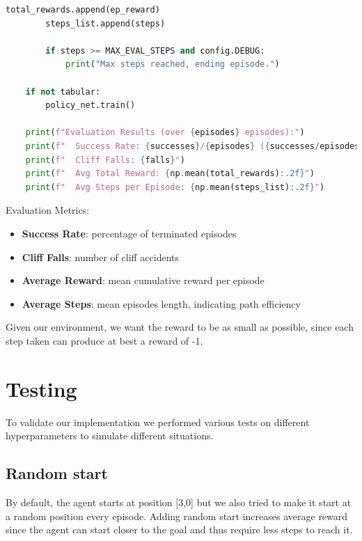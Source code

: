 \documentclass[a4paper,12pt]{article}
\begin{document}
\begin{lstlisting}[language=Python]
        total_rewards.append(ep_reward)
        steps_list.append(steps)

        if steps >= MAX_EVAL_STEPS and config.DEBUG:
            print("Max steps reached, ending episode.")

    if not tabular:
        policy_net.train()

    print(f"Evaluation Results (over {episodes} episodes):")
    print(f"  Success Rate: {successes}/{episodes} ({successes/episodes*100:.1f}%)")
    print(f"  Cliff Falls: {falls}")
    print(f"  Avg Total Reward: {np.mean(total_rewards):.2f}")
    print(f"  Avg Steps per Episode: {np.mean(steps_list):.2f}")
\end{lstlisting}
Evaluation Metrics:
\begin{itemize}
    \item \textbf{Success Rate}: percentage of terminated episodes
    \item \textbf{Cliff Falls}: number of cliff accidents
    \item \textbf{Average Reward}: mean cumulative reward per episode
    \item \textbf{Average Steps}: mean episodes length, indicating path efficiency
\end{itemize}
Given our environment, we want the reward to be as small as possible, since each step taken can produce at best a reward of -1.
\section{Testing}
To validate our implementation we performed various tests on different hyperparameters to simulate different situations.

\subsection{Random start}
By default, the agent starts at position [3,0] but we also tried to make it start at a random position every episode.
Adding random start increases average reward since the agent can start closer to the goal and thus require less steps to reach it.
\end{document}
